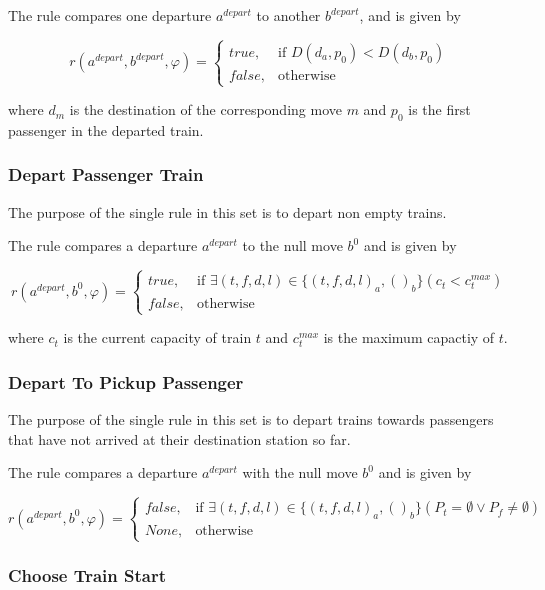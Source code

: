 \documentclass[a4paper,10pt,parskip]{article}
\begin{document}
The rule compares one departure $a^{depart}$ to another $b^{depart}$, and is 
given by

\[
    r(a^{depart}, b^{depart}, \varphi) = 
    \begin{cases}
        true,& \text{if } D(d_a, p_0) < D(d_b, p_0)\\
        false,& \text{otherwise}
    \end{cases}
\]

\noindent where $d_m$ is the destination of the corresponding move $m$ and $p_0$ is the 
first passenger in the departed train.

\subsubsection{Depart Passenger Train}
\label{rule:8}

The purpose of the single rule in this set is to depart non empty trains.

The rule compares a departure $a^{depart}$ to the null move $b^{0}$ and is given 
by

\[
    r(a^{depart}, b^{0}, \varphi) = 
    \begin{cases}
        true,& \text{if } \exists (t,f,d,l) \in \{(t,f,d,l)_a,()_b\} (c_{t} < c^{max}_t)\\
        false,& \text{otherwise}
    \end{cases}
\]

\noindent where $c_t$ is the current capacity of train $t$ and $c^{max}_t$ is the maximum 
capactiy of $t$.

\subsubsection{Depart To Pickup Passenger}
\label{rule:9}

The purpose of the single rule in this set is to depart trains towards 
passengers that have not arrived at their destination station so far.

The rule compares a departure $a^{depart}$ with the null move $b^0$ and is given by

\[
    r(a^{depart}, b^{0}, \varphi) = 
    \begin{cases}
        false,& \text{if } \exists (t,f,d,l) \in \{(t,f,d,l)_a, ()_b\} (P_t = \emptyset \lor P_f \neq \emptyset)\\
        None,& \text{otherwise}
    \end{cases}
\]

\subsubsection{Choose Train Start}
\label{rule:10}
\end{document}
